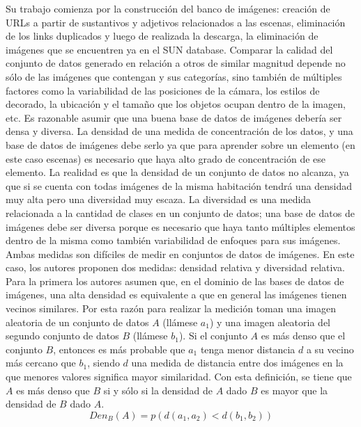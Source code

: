 Su trabajo comienza por la construcción del banco de imágenes: creación de URLs a partir de sustantivos y adjetivos relacionados a las escenas, eliminación de los links duplicados y luego de realizada la descarga, la eliminación de imágenes que se encuentren ya en el SUN database. Comparar la calidad del conjunto de datos generado en relación a otros de similar magnitud depende no sólo de las imágenes que contengan y sus categorías, sino también de múltiples factores como la variabilidad de las posiciones de la cámara, los estilos de decorado, la ubicación y el tamaño que los objetos ocupan dentro de la imagen, etc. Es razonable asumir que una buena base de datos de imágenes debería ser densa y diversa. La densidad de una medida de concentración de los datos, y una base de datos de imágenes debe serlo ya que para aprender sobre un elemento (en este caso escenas) es necesario que haya alto grado de concentración de ese elemento. La realidad es que la densidad de un conjunto de datos no alcanza, ya que si se cuenta con todas imágenes de la misma habitación tendrá una densidad muy alta pero una diversidad muy escaza. La diversidad es una medida relacionada a la cantidad de clases en un conjunto de datos; una base de datos de imágenes debe ser diversa porque es necesario que haya tanto múltiples elementos dentro de la misma como también variabilidad de enfoques para sus imágenes. Ambas medidas son difíciles de medir en conjuntos de datos de imágenes.
En este caso, los autores proponen dos medidas: densidad relativa y diversidad relativa. Para la primera los autores asumen que, en el dominio de las bases de datos de imágenes, una alta densidad es equivalente a que en general las imágenes tienen vecinos similares. Por esta razón para realizar la medición toman una imagen aleatoria de un conjunto de datos \(A\) (llámese \(a_{1}\)) y una imagen aleatoria del segundo conjunto de datos \(B\)  (llámese \(b_{1}\)). Si el conjunto \(A\) es más denso que el conjunto \(B\), entonces es más probable que \(a_{1}\) tenga menor distancia \(d\) a su vecino más cercano que \(b_{1}\), siendo \(d\) una medida de distancia entre dos imágenes en la que menores valores significa mayor similaridad. Con esta definición, se tiene que \(A\) es más denso que \(B\) si y sólo si la densidad de  \(A\) dado \(B\) es mayor que la densidad de \(B\) dado \(A\). 
\begin{equation}
{Den}_{B}(A)=p\left(d\left(a_{1}, a_{2}\right)<d\left(b_{1}, b_{2}\right)\right)
\end{equation}

